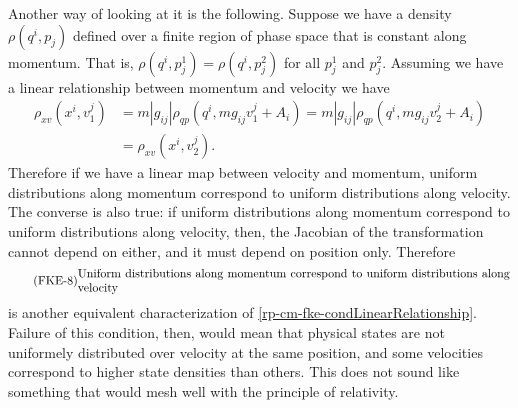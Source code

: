 Another way of looking at it is the following. Suppose we have a density $\rho(q^i, p_j)$ defined over a finite region of phase space that is constant along momentum. That is, $\rho(q^i, p^1_j) = \rho(q^i, p^2_j)$ for all $p^1_j$ and $p^2_j$. Assuming we have a linear relationship between momentum and velocity we have
\begin{equation}
	\begin{aligned}
		\rho_{xv}(x^i, v_1^j) &= m |g_{ij}| \rho_{qp}(q^i, m g_{ij}v_1^j + A_i) = m |g_{ij}| \rho_{qp}(q^i, m g_{ij}v_2^j + A_i) \\
		&= \rho_{xv}(x^i, v_2^j).
	\end{aligned}
\end{equation}
Therefore if we have a linear map between velocity and momentum, uniform distributions along momentum correspond to uniform distributions along velocity. The converse is also true: if uniform distributions along momentum correspond to uniform distributions along velocity, then, the Jacobian of the transformation cannot depend on either, and it must depend on position only. Therefore
\begin{equation}
	\tag{FKE-8}\label{rp-cm-fke-condUniformDistributions}
	\parbox{5in}{Uniform distributions along momentum correspond to uniform distributions along velocity}
\end{equation}
is another equivalent characterization of \ref{rp-cm-fke-condLinearRelationship}. Failure of this condition, then, would mean that physical states are not uniformely distributed over velocity at the same position, and some velocities correspond to higher state densities than others. This does not sound like something that would mesh well with the principle of relativity.

